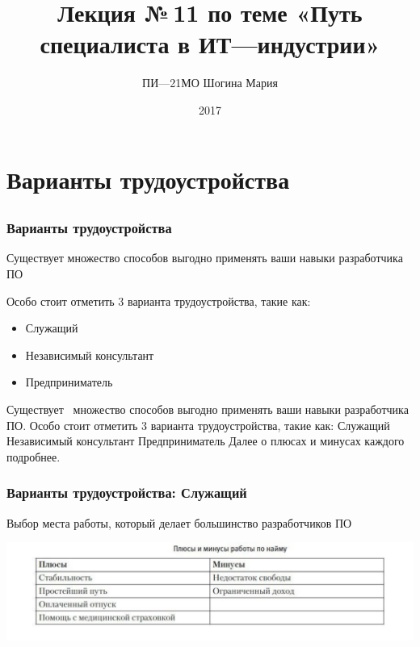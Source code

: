 \documentclass{../industrial-development}
\title{ Лекция №\,11 по теме «Путь специалиста в ИТ---индустрии»}
\author{ПИ---21МО Шогина Мария}
\date{2017 }
\begin{document}
\begin{frame}
  \titlepage
\end{frame}

\section{Варианты трудоустройства }

\subsection{}

\begin{frame} \frametitle{Варианты трудоустройства}
  \begin{block}{}
  Существует множество способов выгодно применять ваши навыки разработчика ПО 

Особо стоит отметить 3 варианта трудоустройства, такие как:
  \end{block}
  
  \begin{itemize}
  \item Служащий
  \item Независимый консультант
  \item Предприниматель
  \end{itemize}
\end{frame}

\lecturenotes
 Существует~\cite[с.~62--67]{Sonmez} множество способов выгодно применять ваши навыки разработчика ПО. Особо стоит отметить 3 варианта трудоустройства, такие как:
Служащий
 Независимый консультант
Предприниматель
Далее о плюсах и минусах каждого подробнее.

\begin{frame} \frametitle{Варианты трудоустройства: Служащий}
  \begin{block}{}
    Выбор места работы, который делает большинство разработчиков ПО 
  \end{block}
  
  \centerline{\includegraphics[height=0.38\textheight]{11-IT-specialist's-way/sl.pdf}}
\end{frame}
\end{document}
